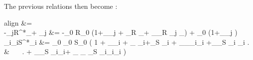 \documentclass[12pt, titlepage]{report}
\begin{document}
	 The previous relations then become :
	 \begin{empheq}[left=\empheqlbrace]{align}
	  &=  \\
	 -\gamma_{j\mu}R^*_\mu + \alpha_{\mu j} &= -\gamma_0 R_0 \left(1+\epsilon_\gamma \tilde{\gamma}_{j\mu} + \epsilon_R  _\mu + \epsilon_\gamma \epsilon_R  \tilde{\gamma}_{j\mu} _\mu\right) + \alpha_0 \left(1+\epsilon_\alpha \tilde{\alpha}_{\mu j}  \right) \\
	 \sigma_{i\nu}\gamma_{i\nu}S^*_i &= \sigma_0 \gamma_0 S_0 \left( 1 + \epsilon_\sigma \tilde{\sigma}_{i\nu} + \epsilon_{\gamma}  \tilde{\gamma}_{i\nu}+\epsilon_S  _i + \epsilon_\sigma \epsilon_\gamma  \tilde{\sigma}_{i\nu}\tilde{\gamma}_{i\nu}  +\epsilon_\sigma \epsilon_S  \tilde{\sigma}_{i\nu} _i  \right. \nonumber \\
	  & \ \ \  \left. + \epsilon_\gamma \epsilon_S  \tilde{\gamma}_{i\nu}_i+ \epsilon_{\sigma} \epsilon_{\gamma} \epsilon_{S}  \tilde{\sigma}_{i\nu}\tilde{\gamma}_{i\nu}_i \right)
	 \end{empheq}
\end{document}
